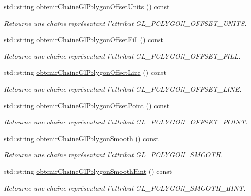\begin{DoxyCompactItemize}
std\-::string \hyperlink{group__utilitaire_ga5e5f7eacf5333293ba0f1a02bbe3cdc5}{obtenir\-Chaine\-Gl\-Polygon\-Offset\-Units} () const 
\begin{DoxyCompactList}\small\item\em Retourne une chaîne représentant l'attribut G\-L\-\_\-\-P\-O\-L\-Y\-G\-O\-N\-\_\-\-O\-F\-F\-S\-E\-T\-\_\-\-U\-N\-I\-T\-S. \end{DoxyCompactList}\item 
std\-::string \hyperlink{group__utilitaire_gaa4f958b650aeedc92140b1406f98d985}{obtenir\-Chaine\-Gl\-Polygon\-Offset\-Fill} () const 
\begin{DoxyCompactList}\small\item\em Retourne une chaîne représentant l'attribut G\-L\-\_\-\-P\-O\-L\-Y\-G\-O\-N\-\_\-\-O\-F\-F\-S\-E\-T\-\_\-\-F\-I\-L\-L. \end{DoxyCompactList}\item 
std\-::string \hyperlink{group__utilitaire_ga7470a404bbcbef21d1316b3bfd02deb6}{obtenir\-Chaine\-Gl\-Polygon\-Offset\-Line} () const 
\begin{DoxyCompactList}\small\item\em Retourne une chaîne représentant l'attribut G\-L\-\_\-\-P\-O\-L\-Y\-G\-O\-N\-\_\-\-O\-F\-F\-S\-E\-T\-\_\-\-L\-I\-N\-E. \end{DoxyCompactList}\item 
std\-::string \hyperlink{group__utilitaire_ga19543110e1a7115a1ec9a30caaa490fe}{obtenir\-Chaine\-Gl\-Polygon\-Offset\-Point} () const 
\begin{DoxyCompactList}\small\item\em Retourne une chaîne représentant l'attribut G\-L\-\_\-\-P\-O\-L\-Y\-G\-O\-N\-\_\-\-O\-F\-F\-S\-E\-T\-\_\-\-P\-O\-I\-N\-T. \end{DoxyCompactList}\item 
std\-::string \hyperlink{group__utilitaire_gac4627c5f84f92d1e259d756aba7d6068}{obtenir\-Chaine\-Gl\-Polygon\-Smooth} () const 
\begin{DoxyCompactList}\small\item\em Retourne une chaîne représentant l'attribut G\-L\-\_\-\-P\-O\-L\-Y\-G\-O\-N\-\_\-\-S\-M\-O\-O\-T\-H. \end{DoxyCompactList}\item 
std\-::string \hyperlink{group__utilitaire_ga45100a9646aab1c37b538298c55cb0ca}{obtenir\-Chaine\-Gl\-Polygon\-Smooth\-Hint} () const 
\begin{DoxyCompactList}\small\item\em Retourne une chaîne représentant l'attribut G\-L\-\_\-\-P\-O\-L\-Y\-G\-O\-N\-\_\-\-S\-M\-O\-O\-T\-H\-\_\-\-H\-I\-N\-T. \end{DoxyCompactList}\item 

\end{DoxyCompactItemize}
